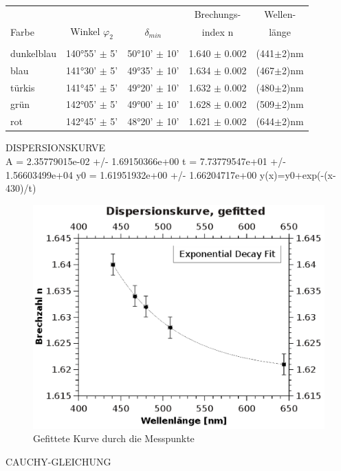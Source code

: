 \documentclass{article}
\begin{document}
\begin{center}
\begin{tabular}{|l|c|c|c|c|}
\hline & & & Brechungs- & Wellen-\\
Farbe & Winkel $\varphi_2$ & $\delta_{min}$ & index n & länge\\
\hline
& & & &\\
dunkelblau & 140°55' $\pm$ 5' & 50°10' $\pm$ 10' & 1.640 $\pm$ 0.002 & (441$\pm$2)nm\\
blau & 141°30' $\pm$ 5' & 49°35' $\pm$ 10' & 1.634 $\pm$ 0.002 & (467$\pm$2)nm\\
türkis & 141°45' $\pm$ 5' & 49°20' $\pm$ 10' & 1.632 $\pm$ 0.002 & (480$\pm$2)nm\\
grün & 142°05' $\pm$ 5' & 49°00' $\pm$ 10' & 1.628 $\pm$ 0.002 & (509$\pm$2)nm\\
rot & 142°45' $\pm$ 5' & 48°20' $\pm$ 10' & 1.621 $\pm$ 0.002 & (644$\pm$2)nm\\
\hline
\end{tabular}
\end{center}
DISPERSIONSKURVE\\
A = 2.35779015e-02 +/- 1.69150366e+00
t = 7.73779547e+01 +/- 1.56603499e+04
y0 = 1.61951932e+00 +/- 1.66204717e+00
y(x)=y0+exp(-(x-430)/t)
\begin{center}
\begin{figure}
\caption{Gefittete Kurve durch die Messpunkte}
\includegraphics[scale=0.7]{fit.eps}
\end{figure}
\end{center}
CAUCHY-GLEICHUNG\\
\end{document}
